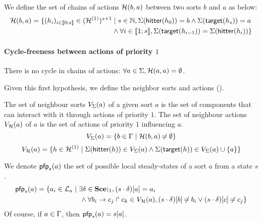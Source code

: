 \begin{definition}
\label{def:chainsactions}
  We define the set of chains of actions $\mathcal{H}(b, a)$ between two sorts $b$ and $a$ as below:
  \begin{align*}
  \mathcal{H}(b, a) = \{ (h_i)_{i \in \llbracket 0; s \rrbracket} \in (\mathcal{H}^{(1)})^{s+1} &\mid s \in \mathbb{N}, \Sigma(\mathsf{hitter}(h_0)) = b \wedge \Sigma(\mathsf{target}(h_s)) = a \\
    & \wedge \forall i \in \llbracket 1; s \rrbracket, \Sigma(\mathsf{target}(h_{i-1})) = \Sigma(\mathsf{hitter}(h_{i})) \}
  \end{align*}
\end{definition}

\paragraph{Cycle-freeness between actions of priority $1$}
There is no cycle in chains of actions: $\forall a \in \Sigma, \mathcal{H}(a, a) = \emptyset$.

Given this first hypothesis, we define the neighbor  sorts and actions ().
\begin{definition}
\label{def:neighbors}
  The set of neighbour sorts $V_\Sigma(a)$ of a given sort $a$ is the set of components that can interact with it through actions of priority $1$.
  The set of neighbour actions $V_{\mathcal{H}}(a)$ of $a$ is the set of actions of priority $1$ influencing $a$.
  $$V_\Sigma(a) = \{ b \in \Gamma \mid \mathcal{H}(b, a) \not\nobreak\mkern -2mu = \emptyset \}$$
  $$V_{\mathcal{H}}(a) = \{ h \in \mathcal{H}^{(1)} \mid \Sigma(\mathsf{hitter}(h)) \in V_\Sigma(a) \wedge \Sigma(\mathsf{target}(h)) \in V_\Sigma(a) \cup \{ a \} \}$$
\end{definition}

We denote $\mathsf{pfp}_s(a)$ the set of possible local steady-states of a sort $a$ from a state $s$.
\begin{align*}
  \pfp_s(a) = \{ a_i \in \PHl_a &\mid \exists \delta \in \restriction{\Sce}{1}, \PHget{(s \PHplay \delta)}{a} = a_i \\
  & \quad \wedge \forall \PHhit{b_i}{c_j}{c_k} \in \Vh(a), \PHget{(s \PHplay \delta)}{b} \neq b_i \vee \PHget{(s \PHplay \delta)}{c} \neq c_j \}
\end{align*}
Of course, if $a \in \Gamma$, then $\mathsf{pfp}_s(a) = {s[a]}$.

